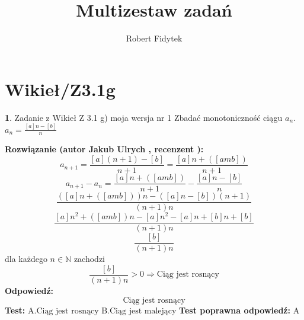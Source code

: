 \documentclass[12pt, a4paper]{article}
\title{Multizestaw zadań}
\author{Robert Fidytek}
\date{}
\theoremstyle{definition} %
\newtheorem{zad}{}
\newcommand{\kategoria}[1]{\section{#1}} %
\newcommand{\zadStart}[1]{\begin{zad}#1\newline} %
\newcommand{\zadStop}{\end{zad}}   %
\newcommand{\rozwStart}[2]{\noindent \textbf{Rozwiązanie (autor #1 , recenzent #2): }\newline} %
\newcommand{\rozwStop}{\newline}                                            %
\newcommand{\odpStart}{\noindent \textbf{Odpowiedź:}\newline}    %
\newcommand{\odpStop}{\newline}                                             %
\newcommand{\testStart}{\noindent \textbf{Test:}\newline} %
\newcommand{\testStop}{\newline} %
\newcommand{\kluczStart}{\noindent \textbf{Test poprawna odpowiedź:}\newline} %
\newcommand{\kluczStop}{\newline} %
\begin{document}
\maketitle


\kategoria{Wikieł/Z3.1g}
\zadStart{Zadanie z Wikieł Z 3.1 g) moja wersja nr 1}
Zbadać monotoniczność ciągu $a_{n}$.\\ $a_{n}=\frac{[a]n-[b]}{n}$
\zadStop
\rozwStart{Jakub Ulrych}{}
$$a_{n+1}=\frac{[a](n+1)-[b]}{n+1}=\frac{[a]n+([amb])}{n+1}$$
$$a_{n+1}-a_{n}=\frac{[a]n+([amb])}{n+1}-\frac{[a]n-[b]}{n}$$
$$\frac{([a]n+([amb]))n-([a]n-[b])(n+1)}{(n+1)n}$$
$$\frac{[a]n^{2}+([amb])n-[a]n^{2}-[a]n+[b]n+[b]}{(n+1)n}$$
$$\frac{[b]}{(n+1)n}$$
dla każdego $n\in\mathbb{N}$ zachodzi
$$\frac{[b]}{(n+1)n}>0\Rightarrow \text{Ciąg jest rosnący}$$
\rozwStop
\odpStart
$$\text{Ciąg jest rosnący}$$
\odpStop
\testStart
A.$\text{Ciąg jest rosnący}$
B.$\text{Ciąg jest malejący}$
\testStop
\kluczStart
A
\kluczStop
\end{document}
